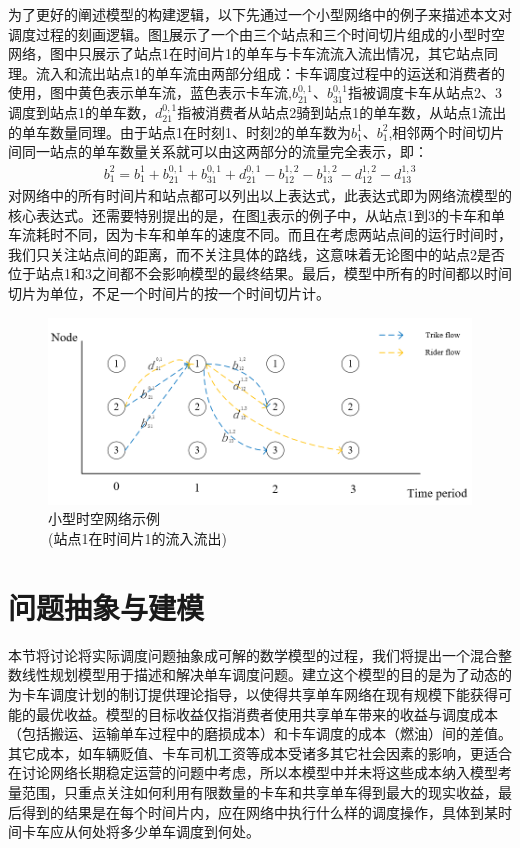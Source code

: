 \documentclass[]{tongjithesis}
\numberwithin{equation}{chapter}
\begin{document}
为了更好的阐述模型的构建逻辑，以下先通过一个小型网络中的例子来描述本文对调度过程的刻画逻辑。图\ref{network_example}展示了一个由三个站点和三个时间切片组成的小型时空网络，图中只展示了站点1在时间片1的单车与卡车流流入流出情况，其它站点同理。流入和流出站点1的单车流由两部分组成：卡车调度过程中的运送和消费者的使用，图中黄色表示单车流，蓝色表示卡车流,$b_{21}^{0,1}$、$b_{31}^{0,1}$指被调度卡车从站点2、3调度到站点1的单车数，$d_{21}^{0,1}$指被消费者从站点2骑到站点1的单车数，从站点1流出的单车数量同理。由于站点1在时刻1、时刻2的单车数为$b_{1}^{1}$、$b_{1}^{2}$,相邻两个时间切片间同一站点的单车数量关系就可以由这两部分的流量完全表示，即：
\begin{align}
	b_{1}^{2} = b_{1}^{1}+b_{21}^{0,1}+b_{31}^{0,1}+d_{21}^{0,1}-b_{12}^{1,2}-b_{13}^{1,2}-d_{12}^{1,2}-d_{13}^{1,3}
\end{align}
对网络中的所有时间片和站点都可以列出以上表达式，此表达式即为网络流模型的核心表达式。还需要特别提出的是，在图\ref{network_example}表示的例子中，从站点1到3的卡车和单车流耗时不同，因为卡车和单车的速度不同。而且在考虑两站点间的运行时间时，我们只关注站点间的距离，而不关注具体的路线，这意味着无论图中的站点2是否位于站点1和3之间都不会影响模型的最终结果。最后，模型中所有的时间都以时间切片为单位，不足一个时间片的按一个时间切片计。
\begin{figure}[H]
	\centering
	\includegraphics[width=0.8 \textwidth]{figures_main/network_example.png}
	\caption{小型时空网络示例 \\
			 (站点1在时间片1的流入流出)
			}
	\label{network_example}
	\end{figure}

\section{问题抽象与建模}
本节将讨论将实际调度问题抽象成可解的数学模型的过程，我们将提出一个混合整数线性规划模型用于描述和解决单车调度问题。建立这个模型的目的是为了动态的为卡车调度计划的制订提供理论指导，以使得共享单车网络在现有规模下能获得可能的最优收益。模型的目标收益仅指消费者使用共享单车带来的收益与调度成本（包括搬运、运输单车过程中的磨损成本）和卡车调度的成本（燃油）间的差值。其它成本，如车辆贬值、卡车司机工资等成本受诸多其它社会因素的影响，更适合在讨论网络长期稳定运营的问题中考虑，所以本模型中并未将这些成本纳入模型考量范围，只重点关注如何利用有限数量的卡车和共享单车得到最大的现实收益，最后得到的结果是在每个时间片内，应在网络中执行什么样的调度操作，具体到某时间卡车应从何处将多少单车调度到何处。
\end{document}
